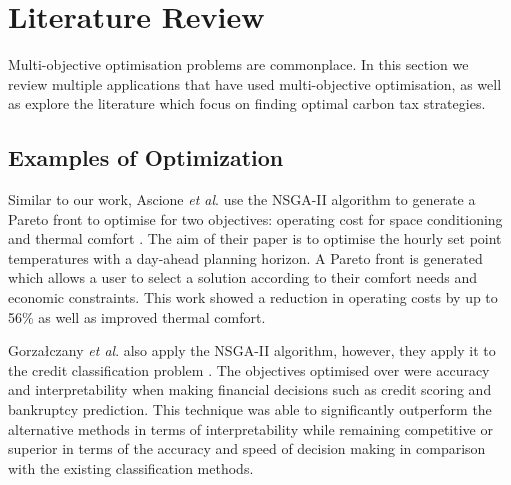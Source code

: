 \documentclass[sigconf]{acmart}
\begin{document}








\section{Literature Review}
\label{sec:lit_review}

Multi-objective optimisation problems are commonplace. In this section we review multiple applications that have used multi-objective optimisation, as well as explore the literature which focus on finding optimal carbon tax strategies.

\subsection{Examples of Optimization}

Similar to our work, Ascione  \textit{et al}. use the NSGA-II algorithm to generate a Pareto front to optimise for two objectives: operating cost for space conditioning and thermal comfort \cite{Ascione2016}. The aim of their paper is to optimise the hourly set point temperatures with a day-ahead planning horizon. A Pareto front is generated which allows a user to select a solution according to their comfort needs and economic constraints. This work showed a reduction in operating costs by up to 56\% as well as improved thermal comfort.

Gorza\l{}czany \textit{et al}. also apply the NSGA-II algorithm, however, they apply it to the credit classification problem \cite{Gorzaczany2016}. The objectives optimised over were accuracy and interpretability when making financial decisions such as credit scoring and bankruptcy prediction. This technique was able to significantly outperform the alternative methods in terms of interpretability while remaining competitive or superior in terms of the accuracy and speed of decision making in comparison with the existing classification methods.

\end{document}
